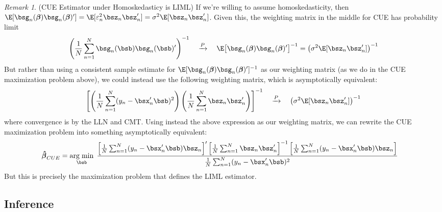 \documentclass[12pt]{article}
\theoremstyle{plain}
\theoremstyle{definition}
\theoremstyle{remark}
\newtheorem*{rmk}{Remark}
\newcommand{\ra}{\rightarrow}
\newcommand{\bsbeta}{\boldsymbol{\beta}}
\newcommand{\bshatbeta}{\boldsymbol{\hat{\beta}}}
\DeclareMathOperator*{\argmin}{arg\;min}
\newcommand{\pto}{\xrightarrow{P}}
\newcommand{\sumnN}{\sum^N_{n=1}}
\begin{document}
\begin{rmk}(CUE Estimator under Homoskedasticy is LIML)
If we're willing to assume homoskedasticity, then
$\E[\bsg_n(\bsbeta)\bsg_n(\bsbeta)']=\E[\varepsilon_n^2\bsz_n\bsz_n']=\sigma^2
\E[\bsz_n\bsz_n']$. Given this,
the weighting matrix in the middle for CUE has probability limit
\begin{align}
  \left(
  \frac{1}{N}\sumnN
  \bsg_n(\bsb)\bsg_n(\bsb)'
  \right)^{-1}
  \quad \pto\quad
  \E\big[
  \bsg_n(\bsbeta)\bsg_n(\bsbeta)'
  \big]^{-1} =
  \left(\sigma^2 \E[\bsz_n\bsz_n']\right)^{-1}
  \label{sendog:cue}
\end{align}
But rather than using a consistent sample estimate for
$\E[\bsg_n(\bsbeta)\bsg_n(\bsbeta)']^{-1}$ as our weighting matrix (as
we do in the CUE maximization problem above), we could instead use the
following weighting matrix, which is asymptotically equivalent:
\begin{align*}
  \left[
    \left(
      \frac{1}{N}\sumnN (y_n-\bsx_n'\bsb)^2
    \right)
    \left(
      \frac{1}{N}\sumnN \bsz_n\bsz_n'
    \right)
  \right]^{-1}
  \quad\pto\quad
  \left(\sigma^2 \E[\bsz_n\bsz_n']\right)^{-1}
\end{align*}
where convergence is by the LLN and CMT.
Using instead the above expression as our weighting matrix, we can
rewrite the CUE maximization problem into something asymptotically
equivalent:
\begin{align*}
  \bshatbeta_{CUE} &=
  \argmin_{\bsb}\;
  \frac{%
  \left[
  \frac{1}{N} \sumnN (y_n-\bsx_n'\bsb)\bsz_n
  \right]'
  \left[
    \frac{1}{N}\sumnN \bsz_n\bsz_n'
  \right]^{-1}
  \left[
  \frac{1}{N} \sumnN (y_n-\bsx_n'\bsb)\bsz_n
  \right]
  }{\frac{1}{N}\sumnN (y_n-\bsx_n'\bsb)^2}
\end{align*}
But this is precisely the maximization problem that defines the LIML
estimator.
\end{rmk}



\clearpage
\subsection{Inference}
\end{document}
